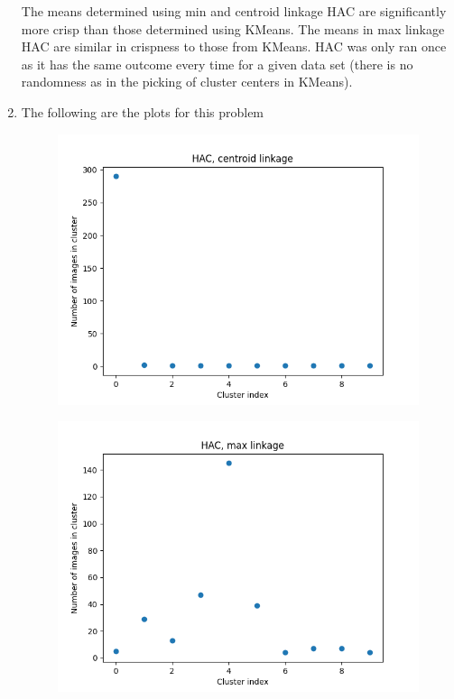 \documentclass[submit]{harvardml}
\begin{document}
\begin{enumerate}
The means determined using min and centroid linkage HAC are significantly more crisp than
those determined using KMeans. The means in max linkage HAC are similar in crispness to 
those from KMeans. HAC was only ran once as it has the same outcome every time for 
a given data set (there is no randomness as in the picking of cluster centers in KMeans).

\newpage
\item The following are the plots for this problem 
\begin{figure}[h]
\includegraphics[width=\linewidth]{part5haccentroid}
\end{figure}

\newpage
\begin{figure}[h]
\includegraphics[width=\linewidth]{part5hacmax}
\end{figure}


\end{enumerate}
\end{document}
